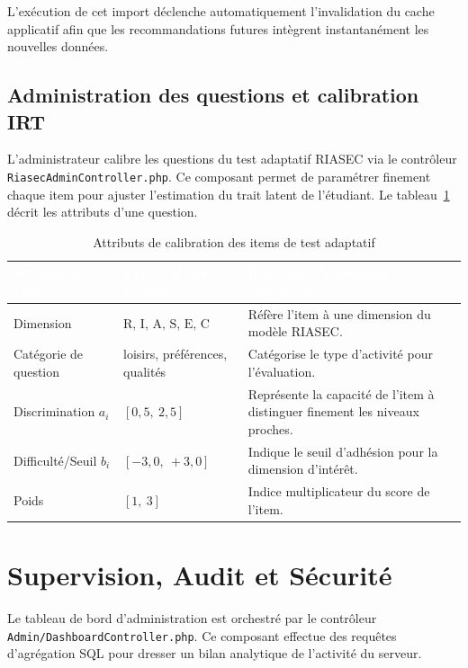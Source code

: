 L'exécution de cet import déclenche automatiquement l'invalidation du cache applicatif afin que les recommandations futures intègrent instantanément les nouvelles données.

\subsection{Administration des questions et calibration IRT}

L'administrateur calibre les questions du test adaptatif RIASEC via le contrôleur \texttt{RiasecAdminController.php}. Ce composant permet de paramétrer finement chaque item pour ajuster l'estimation du trait latent de l'étudiant. Le tableau~\ref{tab:questions_fields} décrit les attributs d'une question.

\begin{table}[H]
\centering
\small
\begin{tabular}{|p{3.5cm}|p{4.5cm}|p{7cm}|}
\hline
\rowcolor{headercolor} 
\textcolor{white}{\textbf{Attribut de l'item}} & \textcolor{white}{\textbf{Type / Plage de valeurs}} & \textcolor{white}{\textbf{Rôle dans l'évaluation adaptative}} \\
\hline
Dimension & $\text{R, I, A, S, E, C}$ & Réfère l'item à une dimension du modèle RIASEC. \\
\hline
\rowcolor{rowgray}
Catégorie de question & loisirs, préférences, qualités & Catégorise le type d'activité pour l'évaluation. \\
\hline
Discrimination $a_i$ & $[0{,}5,\ 2{,}5]$ & Représente la capacité de l'item à distinguer finement les niveaux proches. \\
\hline
\rowcolor{rowgray}
Difficulté/Seuil $b_i$ & $[-3{,}0,\ +3{,}0]$ & Indique le seuil d'adhésion pour la dimension d'intérêt. \\
\hline
Poids & $[1,\ 3]$ & Indice multiplicateur du score de l'item. \\
\hline
\end{tabular}
\caption{Attributs de calibration des items de test adaptatif}
\label{tab:questions_fields}
\end{table}

\section{Supervision, Audit et Sécurité}

Le tableau de bord d'administration est orchestré par le contrôleur \texttt{Admin/DashboardController.php}. Ce composant effectue des requêtes d'agrégation SQL pour dresser un bilan analytique de l'activité du serveur.

